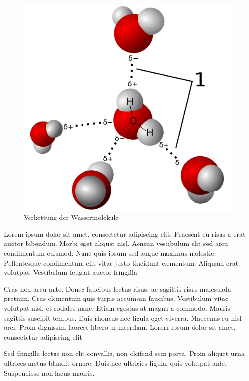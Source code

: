 \begin{figure}
	\includegraphics[width=\linewidth]{content/xx_test/1032px-3D_model_hydrogen_bonds_in_water.svg.png}
	\caption{Verkettung der Wassermoleküle \cite{TestCitation021}}
\end{figure}

Lorem ipsum dolor sit amet, consectetur adipiscing elit. Praesent eu risus a erat auctor bibendum. Morbi eget aliquet nisl. Aenean vestibulum elit sed arcu condimentum euismod. Nunc quis ipsum sed augue maximus molestie. Pellentesque condimentum elit vitae justo tincidunt elementum. Aliquam erat volutpat. Vestibulum feugiat auctor fringilla.

Cras non arcu ante. Donec faucibus lectus risus, ac sagittis risus malesuada pretium. Cras elementum quis turpis accumsan faucibus. Vestibulum vitae volutpat nisl, et sodales nunc. Etiam egestas at magna a commodo. Mauris sagittis suscipit tempus. Duis rhoncus nec ligula eget viverra. Maecenas eu nisl orci. Proin dignissim laoreet libero in interdum. Lorem ipsum dolor sit amet, consectetur adipiscing elit.

Sed fringilla lectus non elit convallis, non eleifend sem porta. Proin aliquet urna ultrices metus blandit ornare. Duis nec ultricies ligula, quis volutpat ante. Suspendisse non lacus mauris.


